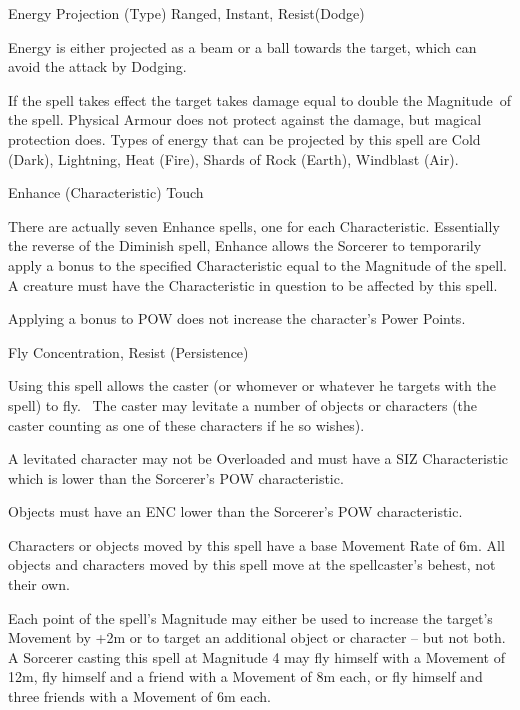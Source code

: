 \begin{samepage}
\begin{rpg-spell}
{Energy Projection (Type)}
{Ranged, Instant, Resist(Dodge)}

Energy is either projected as a beam or a ball towards the target, which can avoid the attack by Dodging.

If the spell takes effect the target takes damage equal to double the Magnitude of the spell. Physical Armour does not protect against the damage, but magical protection does. Types of energy that can be projected by this spell are Cold (Dark), Lightning, Heat (Fire), Shards of Rock (Earth), Windblast (Air).
\end{rpg-spell}
\end{samepage}


\begin{samepage}
\begin{rpg-spell}
{Enhance (Characteristic)}
{Touch}

There are actually seven Enhance spells, one for each Characteristic. Essentially the reverse of the Diminish spell, Enhance allows the Sorcerer to temporarily apply a bonus to the specified Characteristic equal to the Magnitude of the spell. A creature must have the Characteristic in question to be affected by this spell. 

Applying a bonus to POW does not increase the character’s Power Points. 
\end{rpg-spell}
\end{samepage}


\begin{samepage}
\begin{rpg-spell}
{Fly}
{Concentration, Resist (Persistence)}

Using this spell allows the caster (or whomever or whatever he targets with the spell) to fly.  The caster may levitate a number of objects or characters (the caster counting as one of these characters if he so wishes). 

A levitated character may not be Overloaded and must have a SIZ Characteristic which is lower than the Sorcerer’s POW characteristic. 

Objects must have an ENC lower than the Sorcerer’s POW characteristic. 

Characters or objects moved by this spell have a base Movement Rate of 6m. All objects and characters moved by this spell move at the spellcaster’s behest, not their own. 

Each point of the spell’s Magnitude may either be used to increase the target’s Movement by +2m or to target an additional object or character – but not both. A Sorcerer casting this spell at Magnitude 4 may fly himself with a Movement of 12m, fly himself and a friend with a Movement of 8m each, or fly himself and three friends with a Movement of 6m each.
\end{rpg-spell}
\end{samepage}



